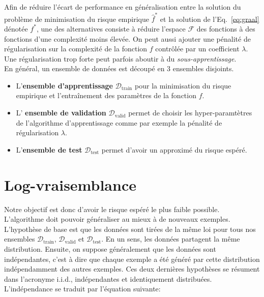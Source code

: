 Afin de réduire l'écart de performance en généralisation entre la solution du
problème de minimisation du risque empirique $\hat{f}^*$ et la solution de
l'Eq.~\ref{eq:graal} dénotée $f^*$, une des alternatives consiste à réduire
l'espace $\mathcal{F}$ des fonctions à des fonctions d'une complexité moins
élevée. On peut aussi ajouter une pénalité de régularisation sur la complexité
de la fonction $f$ contrôlée par un coefficient $\lambda$. Une régularisation
trop forte peut parfois aboutir à du \emph{sous-apprentissage}.  \\

En général, un ensemble de données est découpé en $3$ ensembles disjoints.


\begin{itemize}

\item L'{\bf ensemble d'apprentissage} $\mathcal{D}_\textrm{train}$ pour la
minimisation du risque empirique et l'entraînement des paramètres de la
fonction $f$.

\item L' {\bf ensemble de validation} $\mathcal{D_{\mathrm{valid}}}$ permet de
choisir les hyper-paramtètres de l'algorithme d'apprentissage comme par exemple
la pénalité de régularisation $\lambda$.

\item L'{\bf ensemble de test} $\mathcal{D_{\mathrm{test}}}$  permet d'avoir un
approximé du risque espéré.

\end{itemize}

\section{Log-vraisemblance}

Notre objectif est donc d'avoir le risque espéré le plus faible possible.
L'algorithme doit pouvoir généraliser au mieux à de nouveaux exemples.
L'hypothèse de base est que les données sont tirées de la même loi pour tous
nos ensembles $\mathcal{D}_\textrm{train}$, $\mathcal{D_{\mathrm{valid}}}$ et
$\mathcal{D_{\mathrm{test}}}$. En un sens, les données partagent la même
distribution.  Ensuite, on suppose généralement que les données sont
indépendantes, c'est à dire que chaque exemple a été généré par cette
distribution indépendamment des autres exemples.  Ces deux dernières hypothèses
se résument dans l'acronyme i.i.d., indépendantes et identiquement distribuées.
L'indépendance se traduit par l'équation suivante:

